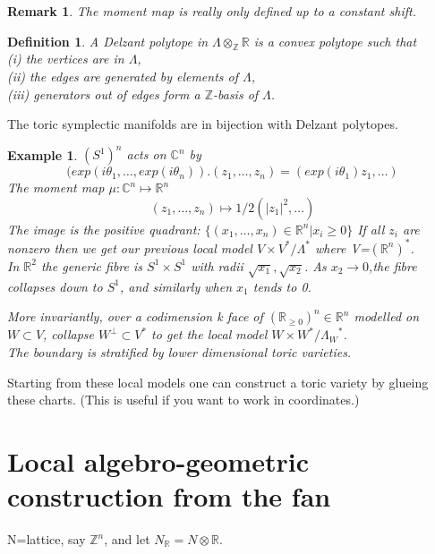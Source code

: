 \documentclass[a4paper]{article}
\newtheorem{defn}[thm]{Definition}
\newtheorem{eg}[thm]{Example}
\newtheorem{rmk}[thm]{Remark}
\newcommand{\R}{\mathbb{R}}
\newcommand{\C}{\mathbb{C}}
\newcommand{\Z}{\mathbb{Z}}
\begin{document}
	\begin{rmk}
		The moment map is really only defined up to a constant shift.
	\end{rmk}
	
	
	\begin{defn} A \it Delzant polytope \rm in $\Lambda\otimes_{\mathbb{Z}}\mathbb{R}$ is a convex polytope such that\\
		(i) the vertices are in $\Lambda$,\\
		(ii) the edges are generated by elements of $\Lambda$,\\
		(iii) generators out of edges form a $\mathbb{Z}$-basis of $\Lambda$. 
	\end{defn}
	
	The toric symplectic manifolds are in bijection with Delzant polytopes.
	
	\begin{eg}
		$(S^1)^n$ acts on $\C^n$ by
		$$ (exp(i\theta_1, \ldots, exp(i\theta_n)).(z_1,\ldots, z_n)=(exp(i\theta_1)z_1, \ldots)$$
		The moment map $\mu: \C^n \mapsto \R^n$
		$$(z_1,\ldots, z_n)\mapsto 1/2(|z_1|^2, \ldots)$$
		The image is the positive quadrant: $\{(x_1,\ldots, x_n) \in \R^n|x_i \geq 0\}$
		If all $z_i$ are nonzero then we get our previous local model $V \times V^{*}/{\Lambda}^{*}$ where V=$(\R^n)^{*}$.\\
		
		In $\R^2$ the generic fibre is $S^1 \times S^1$ with radii $\sqrt{x_1}, \sqrt{x_2}$.
		As $x_2 \to 0$,the fibre collapses down to $S^1$, and similarly when $x_1$ tends to 0.
		
		More invariantly, over a codimension k face of $(\R_{\geq 0})^n \in \R^n$ modelled on $W \subset V$, collapse $W^{\perp} \subset V^* $ to get the local model $ W \times W^{*}/{\Lambda_W}^{*}$.\\
		
		The boundary is stratified by lower dimensional toric varieties.
	\end{eg}
	
	
	
	
	Starting from these local models one can construct a toric variety by glueing these charts. (This is useful if you want to work in coordinates.)
	
	
	
	
	
	\section{Local algebro-geometric construction from the fan}
	N=lattice, say $\Z^{n}$, and let $N_{\R}=N\otimes \R $.
	
\end{document}
